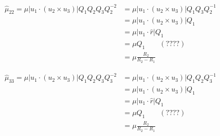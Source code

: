 \documentclass{amsart}
\begin{document}
\begin{align*}
  \hat{\mu}_{22}=\mu|u_1\cdot(u_2\times u_3)|Q_1Q_2Q_3Q_2^{-2}
  &=\mu|u_1\cdot(u_2\times u_3)|Q_1Q_3Q_2^{-1}\\
  &=\mu|u_1\cdot(u_2\times u_3)|Q_1\\
  &=\mu|u_1\cdot\hat{r}|Q_1\\
  &=\mu Q_1\qquad (????)\\
  &=\mu \frac{R_2}{R_2-R_1}
\end{align*}

\begin{align*}
  \hat{\mu}_{33}=\mu|u_1\cdot(u_2\times u_3)|Q_1Q_2Q_3Q_3^{-2}
  &=\mu|u_1\cdot(u_2\times u_3)|Q_1Q_2Q_3^{-1}\\
  &=\mu|u_1\cdot(u_2\times u_3)|Q_1\\
  &=\mu|u_1\cdot\hat{r}|Q_1\\
  &=\mu Q_1\qquad (????)\\
  &=\mu \frac{R_2}{R_2-R_1}
\end{align*}

\end{document}
